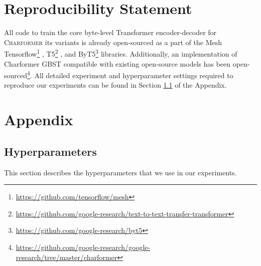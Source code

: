 \documentclass{article} \usepackage{iclr2022_conference,times}
\newcommand{\charformer}{\textsc{Charformer}\xspace}
\begin{document}
\section*{Reproducibility Statement}
All code to train the core byte-level Transformer encoder-decoder for \charformer its variants is already open-sourced as a part of the Mesh Tensorflow\footnote{\url{https://github.com/tensorflow/mesh}} \citep{shazeer2018mesh},  T5\footnote{\url{https://github.com/google-research/text-to-text-transfer-transformer}} \citep{Raffel2020t5}, and ByT5\footnote{\url{https://github.com/google-research/byt5}} \citep{Xue2021byt5} libraries. 
Additionally, an implementation of Charformer GBST compatible with existing open-source models has been open-sourced\footnote{\url{https://github.com/google-research/google-research/tree/master/charformer}}. All detailed experiment and hyperparameter settings required to reproduce our experiments can be found in Section \ref{sec:hyperparams} of the Appendix.




























\newpage 

\section{Appendix}

\subsection{Hyperparameters}
\label{sec:hyperparams}
This section describes the hyperparameters that we use in our experiments.
\end{document}
